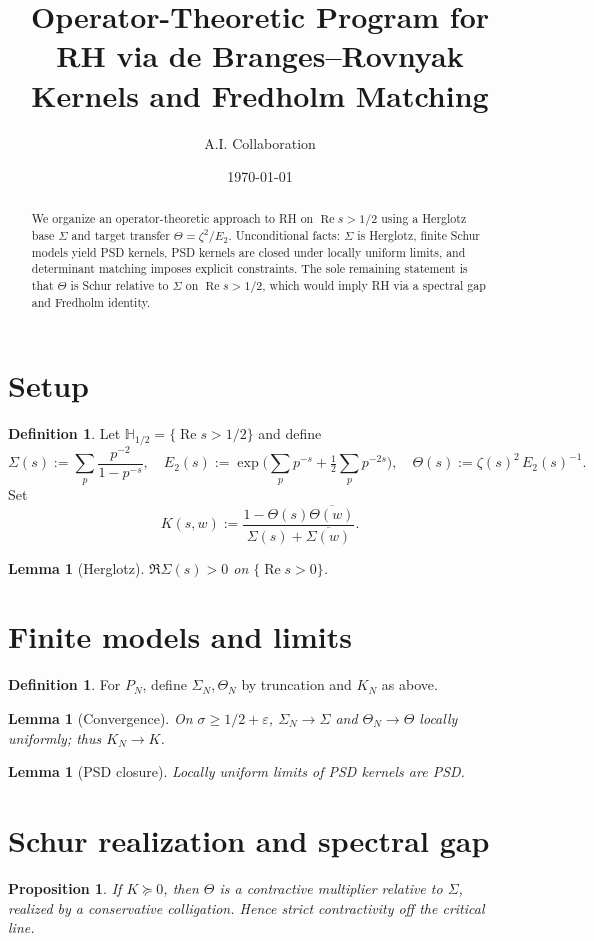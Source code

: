 \documentclass[11pt]{article}
\title{Operator-Theoretic Program for RH via de Branges--Rovnyak Kernels and Fredholm Matching}
\author{A.I. Collaboration}
\date{\today}
\newcommand{\ReS}{\operatorname{Re}}
\newcommand{\Th}{\Theta}
\newcommand{\Si}{\Sigma}
\newcommand{\ThN}{\Theta_N}
\newcommand{\SiN}{\Sigma_N}
\newcommand{\kN}{K_N}
\newcommand{\Hhp}{\mathbb{H}_{1/2}}
\theoremstyle{plain}
\newtheorem{proposition}[theorem]{Proposition}
\newtheorem{lemma}[theorem]{Lemma}
\theoremstyle{definition}
\newtheorem{definition}[theorem]{Definition}
\theoremstyle{remark}
\begin{document}
\maketitle

\begin{abstract}
We organize an operator-theoretic approach to RH on $\ReS s>1/2$ using a Herglotz base $\Si$ and target transfer $\Th=\zeta^2/E_2$. Unconditional facts: $\Si$ is Herglotz, finite Schur models yield PSD kernels, PSD kernels are closed under locally uniform limits, and determinant matching imposes explicit constraints. The sole remaining statement is that $\Th$ is Schur relative to $\Si$ on $\ReS s>1/2$, which would imply RH via a spectral gap and Fredholm identity.
\end{abstract}

\section{Setup}
\begin{definition}
Let $\Hhp=\{ \ReS s>1/2\}$ and define
\[
\Si(s):=\sum_{p} \frac{p^{-2}}{1-p^{-s}},\quad
E_2(s):=\exp\Big(\sum_p p^{-s}+\tfrac12\sum_p p^{-2s}\Big),\quad
\Th(s):=\zeta(s)^2\,E_2(s)^{-1}.
\]
Set
\[K(s,w):=\frac{1-\Th(s)\overline{\Th(w)}}{\Si(s)+\overline{\Si(w)}}.\]
\end{definition}

\begin{lemma}[Herglotz]
$\Re \Si(s)>0$ on $\{\ReS s>0\}$.
\end{lemma}

\section{Finite models and limits}
\begin{definition}
For $P_N$, define $\SiN,\ThN$ by truncation and $\kN$ as above.
\end{definition}

\begin{lemma}[Convergence]
On $\sigma\ge 1/2+\varepsilon$, $\SiN\to\Si$ and $\ThN\to\Th$ locally uniformly; thus $\kN\to K$.
\end{lemma}

\begin{lemma}[PSD closure]
Locally uniform limits of PSD kernels are PSD.
\end{lemma}

\section{Schur realization and spectral gap}
\begin{proposition}
If $K\succeq 0$, then $\Th$ is a contractive multiplier relative to $\Si$, realized by a conservative colligation. Hence strict contractivity off the critical line.
\end{proposition}
\end{document}
